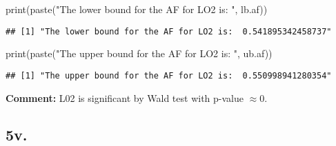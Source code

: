 \documentclass[
]{article}
\newenvironment{Shaded}{\begin{snugshade}}{\end{snugshade}}
\newcommand{\CommentTok}[1]{\textcolor[rgb]{0.56,0.35,0.01}{\textit{#1}}}
\newcommand{\DecValTok}[1]{\textcolor[rgb]{0.00,0.00,0.81}{#1}}
\newcommand{\FunctionTok}[1]{\textcolor[rgb]{0.00,0.00,0.00}{#1}}
\newcommand{\NormalTok}[1]{#1}
\newcommand{\OtherTok}[1]{\textcolor[rgb]{0.56,0.35,0.01}{#1}}
\newcommand{\SpecialCharTok}[1]{\textcolor[rgb]{0.00,0.00,0.00}{#1}}
\newcommand{\StringTok}[1]{\textcolor[rgb]{0.31,0.60,0.02}{#1}}
\begin{document}
\begin{Shaded}
\begin{Highlighting}[]
\FunctionTok{print}\NormalTok{(}\FunctionTok{paste}\NormalTok{(}\StringTok{"The lower bound for the AF for LO2 is: "}\NormalTok{, lb.af))}
\end{Highlighting}
\end{Shaded}

\begin{verbatim}
## [1] "The lower bound for the AF for LO2 is:  0.541895342458737"
\end{verbatim}

\begin{Shaded}
\begin{Highlighting}[]
\FunctionTok{print}\NormalTok{(}\FunctionTok{paste}\NormalTok{(}\StringTok{"The upper bound for the AF for LO2 is: "}\NormalTok{, ub.af))}
\end{Highlighting}
\end{Shaded}

\begin{verbatim}
## [1] "The upper bound for the AF for LO2 is:  0.550998941280354"
\end{verbatim}

\textbf{Comment:} L02 is significant by Wald test with p-value
\(\approx 0\).

\hypertarget{v.}{%
\subsection{5v.}\label{v.}}

\begin{Shaded}
\end{Shaded}
\end{document}
